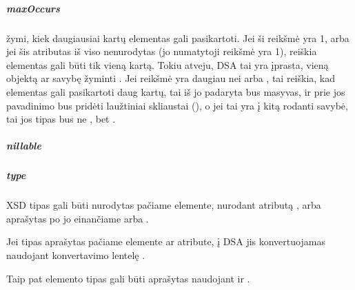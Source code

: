 \documentclass[letterpaper,10pt,lithuanian]{sphinxmanual}
\begin{document}
\subparagraph{maxOccurs}
\label{\detokenize{schemos/xsd:maxoccurs}}\label{\detokenize{schemos/xsd:xsd-maxoccurs}}
\sphinxAtStartPar
{} žymi, kiek daugiausiai kartų elementas gali pasikartoti. Jei ši reikšmė yra 1, arba jei
šis atributas iš viso nenurodytas (jo numatytoji reikšmė yra 1), reiškia elementas gali būti tik
vieną kartą. Tokiu atveju, DSA tai yra įprasta, vieną objektą ar savybę žyminti {\hyperref[\detokenize{formatas:property}]{}}.
Jei  reikšmė yra daugiau nei  arba , tai reiškia, kad elementas gali
pasikartoti daug kartų, tai iš jo padaryta {\hyperref[\detokenize{formatas:property}]{}} bus masyvas, ir prie jos pavadinimo
bus pridėti laužtiniai skliaustai (\sphinxcode{\sphinxupquote{{[}{]}}}), o jei tai yra į kitą {\hyperref[\detokenize{formatas:model}]{}} rodanti savybė, tai
jos tipas bus ne {\hyperref[\detokenize{formatas:ref}]{}}, bet .


\subparagraph{nillable}
\label{\detokenize{schemos/xsd:nillable}}\label{\detokenize{schemos/xsd:xsd-nillable}}

\subparagraph{type}
\label{\detokenize{schemos/xsd:type}}\label{\detokenize{schemos/xsd:xsd-type}}
\sphinxAtStartPar
XSD tipas gali būti nurodytas pačiame elemente, nurodant atributą , arba aprašytas po jo
einančiame  arba .

\sphinxAtStartPar
Jei tipas aprašytas pačiame elemente ar atribute, į DSA {\hyperref[\detokenize{dimensijos:property.type}]{}} jis konvertuojamas naudojant
konvertavimo lentelę .

\sphinxAtStartPar
Taip pat elemento tipas gali būti aprašytas naudojant  ir .
\end{document}
